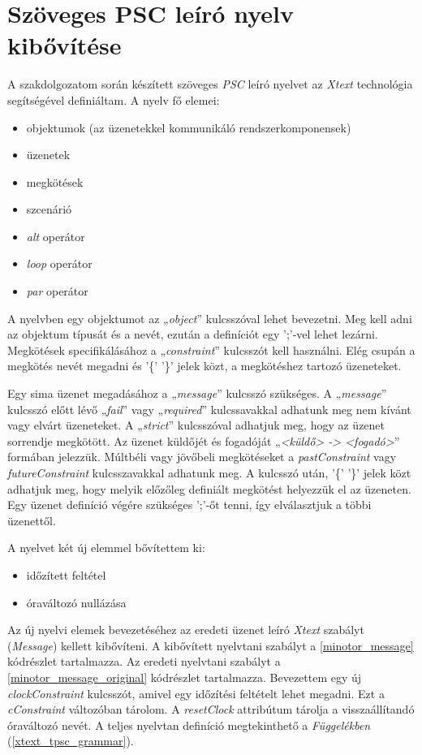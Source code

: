 \chapter{Szöveges PSC leíró nyelv kibővítése}

A szakdolgozatom során készített szöveges \textit{PSC} leíró nyelvet \cite{Bakai} az \textit{Xtext} technológia segítségével definiáltam.
A nyelv fő elemei:
\begin{itemize}
    \item objektumok (az üzenetekkel kommunikáló rendszerkomponensek)
    \item üzenetek
    \item megkötések
    \item szcenárió
    \item \textit{alt} operátor
    \item \textit{loop} operátor
    \item \textit{par} operátor
\end{itemize}

A nyelvben egy objektumot az „\textit{object}” kulcsszóval lehet bevezetni.
Meg kell adni az objektum típusát és a nevét, ezután a definíciót egy ’;’-vel lehet lezárni.
Megkötések specifikálásához a „\textit{constraint}” kulcsszót kell használni.
Elég csupán a megkötés nevét megadni és '\{' '\}' jelek közt, a megkötéshez tartozó üzeneteket.

Egy sima üzenet megadásához a „\textit{message}” kulcsszó szükséges.
A „\textit{message}” kulcsszó előtt lévő „\textit{fail}” vagy „\textit{required}” kulcssavakkal adhatunk meg nem kívánt vagy elvárt üzeneteket.
A „\textit{strict}” kulcsszóval adhatjuk meg, hogy az üzenet sorrendje megkötött.
Az üzenet küldőjét és fogadóját „\textit{<küldő> -> <fogadó>}” formában jelezzük.
Múltbéli vagy jövőbeli megkötéseket a \textit{pastConstraint} vagy \textit{futureConstraint} kulcsszavakkal adhatunk meg.
A kulcsszó után, '\{' '\}' jelek közt adhatjuk meg, hogy melyik előzőleg definiált megkötést helyezzük el az üzeneten.
Egy üzenet definíció végére szükséges ’;’-őt tenni, így elválasztjuk a többi üzenettől.

A nyelvet két új elemmel bővítettem ki:
\begin{itemize}
    \item időzített feltétel
    \item óraváltozó nullázása
\end{itemize}
Az új nyelvi elemek bevezetéséhez az eredeti üzenet leíró \textit{Xtext} szabályt (\textit{Message}) kellett kibővíteni.
A kibővített nyelvtani szabályt a \ref{minotor_message} kódrészlet tartalmazza.
Az eredeti nyelvtani szabályt a \ref{minotor_message_original} kódrészlet tartalmazza.
Bevezettem egy új \textit{clockConstraint} kulcsszót, amivel egy időzítési feltételt lehet megadni.
Ezt a \textit{cConstraint} változóban tárolom.
A \textit{resetClock} attribútum tárolja a visszaállítandó óraváltozó nevét.
A teljes nyelvtan definíció megtekinthető a \textit{Függelékben} (\ref{xtext_tpsc_grammar}).

